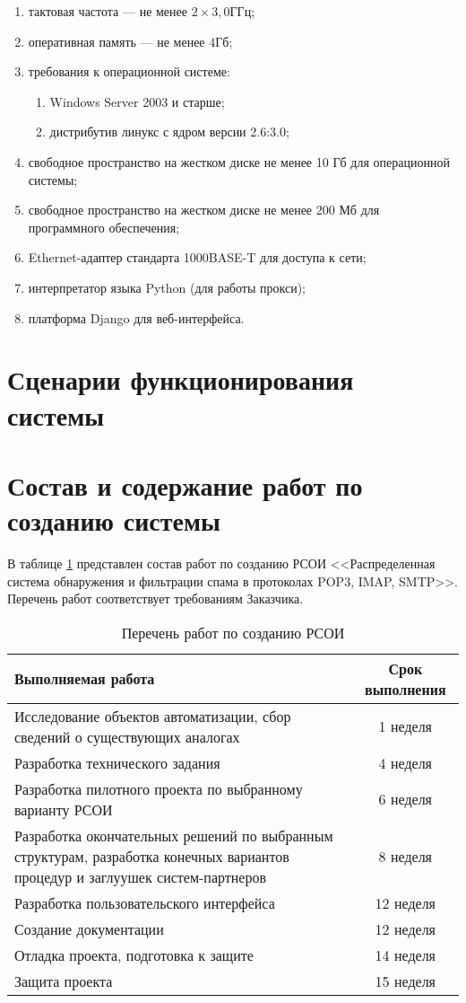 \begin{enumerate}
	\item тактовая частота  --- не менее $2\times3,0 ГГц$; 
	\item оперативная память --- не менее $4 Гб$;
	\item требования к операционной системе:
	\begin{enumerate}
		\item Windows Server 2003 и старше;
		\item дистрибутив линукс с ядром версии 2.6:3.0;
	\end{enumerate}
	\item свободное пространство на жестком диске не менее 10 Гб для операционной системы;
	\item свободное пространство на жестком диске не менее 200 Мб для программного обеспечения;
	\item Ethernet-адаптер стандарта 1000BASE-T для доступа к сети;
	\item интерпретатор языка Python (для работы прокси);
	\item платформа Django для веб-интерфейса.
\end{enumerate}

\section{Сценарии функционирования системы}


\section{Состав и содержание работ по созданию системы}
В таблице \ref{tab:sostav} представлен состав работ по созданию РСОИ <<Распределенная система обнаружения и фильтрации спама в протоколах POP3, IMAP, SMTP>>. Перечень работ соответствует требованиям Заказчика.

\begin{table}[ht]
  \caption{Перечень работ по созданию РСОИ}
  \begin{tabular}{|p{}|c|}
  \hline
  Выполняемая работа & Срок выполнения\\
  \hline
  Исследование объектов автоматизации, сбор сведений о существующих аналогах & 1 неделя \\
  \hline
  Разработка технического задания & 4 неделя \\
  \hline
  Разработка пилотного проекта по выбранному варианту РСОИ & 6 неделя \\
  \hline
  Разработка окончательных решений по выбранным структурам, разработка конечных вариантов процедур и заглуушек систем-партнеров & 8 неделя \\
  \hline
  Разработка пользовательского интерфейса & 12 неделя \\ 
  \hline
   Создание документации & 12 неделя \\
  \hline
  Отладка проекта, подготовка к защите & 14 неделя \\
  \hline
  Защита проекта & 15 неделя\\
  \hline
  \end{tabular}
  \label{tab:sostav}
\end{table}



